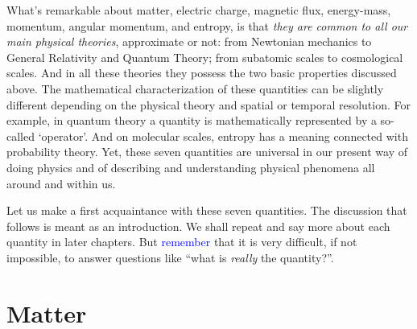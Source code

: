 \documentclass[a4paper,12pt,%
onecolumn,oneside,%
british%
]{memoir}
\providecommand{\href}[2]{#2}
\renewcommand*{\|}[1][]{\nonscript\:#1\vert\nonscript\:\mathopen{}}
\newcommand*{\sect}{\S}%
\newcommand*{\furl}[2]{\href{#1}{#2}\pagenote{\url{#1}}}
\renewcommand*{\autoref}[3][\sect\,\ref]{\textcolor{blue}{#3}
\raisebox{0.6ex}{\color{blue}\miniscule%
\faIcon{angle-right}%
\;#1{#2}\;p.\,\pageref{#2}}}
\newcommand*{\energym}{energy-mass}
\begin{document}
\medskip

What's remarkable about matter, electric charge, magnetic flux, \energym, momentum, angular momentum, and entropy, is that \emph{they are common to all our main physical theories}, approximate or not: from Newtonian mechanics to General Relativity and Quantum Theory; from subatomic scales to cosmological scales. And in all these theories they possess the two basic properties discussed above. The mathematical characterization of these quantities can be slightly different depending on the physical theory and spatial or temporal resolution. For example, in quantum theory a quantity is mathematically represented by a so-called \enquote*{operator}. And on molecular scales, entropy has a meaning connected with probability theory. Yet, these seven quantities are universal in our present way of doing physics and of describing and understanding physical phenomena all around and within us.

%
%

Let us make a first acquaintance with these seven quantities. The discussion that follows is meant as an introduction. We shall repeat and say more about each quantity in later chapters.
But \autoref{sec:primitives}{remember} that it is very difficult, if not impossible, to answer questions like \enquote{what is \emph{really} the quantity\textellipsis?}.

\section{Matter}
\label{sec:intro_matter}
\end{document}
